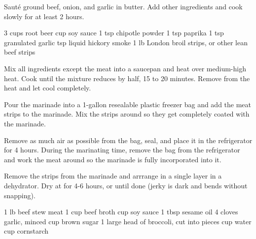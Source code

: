 \begin{method}
  Saut\'e ground beef, onion, and garlic in butter.
  Add other ingredients and cook slowly for at least 2 hours.
\end{method}

\begin{comment}		%
\recipe[]{Red Beans and Rice*}
\serves{}
\freezerfriendly
\preptime{}
\cooktime{}
\begin{ingreds}

\end{ingreds}

\begin{method}

\end{method}

\end{comment}		%


\begin{ingreds}
  3 cups root beer
   cup soy sauce
  1 tsp chipotle powder
  1 tsp paprika
  1 tsp granulated garlic
   tsp liquid hickory smoke
  1 lb London broil strips, or other lean beef strips
\end{ingreds}

\begin{method}
  Mix all ingredients except the meat into a saucepan
  and heat over medium-high heat.
  Cook until the mixture reduces by half, 15 to 20 minutes.
  Remove from the heat and let cool completely.

  Pour the marinade into a 1-gallon resealable plastic
  freezer bag and add the meat strips to the marinade.
  Mix the strips around so they get completely coated with the marinade.

  Remove as much air as possible from the bag,
  seal, and place it in the refrigerator for 4 hours.
  During the marinating time, remove the bag
  from the refrigerator and work the meat around
  so the marinade is fully incorporated into it.

  Remove the strips from the marinade and arrrange
  in a single layer in a dehydrator.
  Dry at  for 4-6 hours, or until done
  (jerky is dark and bends without snapping).
\end{method}

\begin{ingreds}
  1 lb beef stew meat
  1 cup beef broth
   cup soy sauce
  1 tbsp sesame oil
  4 cloves garlic, minced
   cup brown sugar
  1 large head of broccoli, cut into pieces
   cup water
   cup cornstarch
\end{ingreds}


